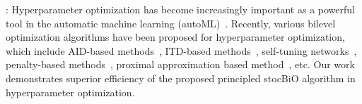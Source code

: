 \documentclass{osudissert96}
\begin{document}
\vspace{0.2cm}
: 
Hyperparameter optimization has become increasingly important as a powerful tool in the automatic machine learning (autoML)~\cite{okuno2018hyperparameter,yu2020hyper}. Recently, various bilevel optimization algorithms have been proposed for hyperparameter optimization, which include AID-based methods~\cite{pedregosa2016hyperparameter,franceschi2018bilevel}, ITD-based  methods~\cite{franceschi2018bilevel,shaban2019truncated,grazzi2020iteration}, self-tuning networks~\cite{mackay2018self,bae2020delta}, penalty-based methods~\cite{mehra2019penalty,sinha2020gradient,liu2021value}, proximal approximation based  method~\cite{jenni2018deep}, etc.  
Our work demonstrates superior efficiency of the proposed principled stocBiO algorithm in hyperparameter optimization.%




\vspace{0.2cm}
\end{document}
